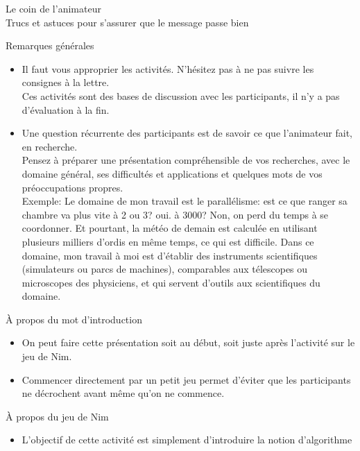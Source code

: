 \documentclass[final,hyperref={pdfpagelabels=false}]{beamer}
\renewcommand*{\footnotesize}{\fontsize{\resultfootnotesizeX}{\resultfootnotesizeY}\selectfont}
\renewcommand*{\large}{\fontsize{\resultlargeX}{\resultlargeY}\selectfont}
\begin{document}
\begin{frame}{Le coin de l'animateur\\[-5pt]
\label{coin::animateur}
  {\large Trucs et astuces pour s'assurer que le message passe bien}}
  \begin{block}{Remarques générales}
    \begin{itemize}
    \item Il faut vous approprier les activités. N'hésitez pas à ne pas suivre
      les consignes à la lettre.\\
      Ces activités sont des bases de discussion avec les participants, il n'y
      a pas d'évaluation à la fin.
    \item Une question récurrente des participants est de savoir ce que
      l'animateur fait, en recherche.\\
      Pensez à préparer une présentation compréhensible de vos recherches, avec
      le domaine général, ses difficultés et applications et quelques mots de
      vos préoccupations propres.\\
      {\footnotesize Exemple: Le domaine de mon travail est le parallélisme:
        est ce que ranger sa chambre va plus vite à 2 ou 3? oui. à 3000? Non,
        on perd du temps à se coordonner. Et pourtant, la météo de demain est
        calculée en utilisant plusieurs milliers d'ordis en même temps, ce qui
        est difficile. Dans ce domaine, mon travail à moi est d'établir des
        instruments scientifiques (simulateurs ou parcs de machines),
        comparables aux télescopes ou microscopes des physiciens, et qui
        servent d'outils aux scientifiques du domaine.}
    \end{itemize}
  \end{block}
  \begin{block}{À propos du mot d'introduction}
    \begin{itemize}
    \item On peut faire cette présentation soit au début, soit juste après
      l'activité sur le jeu de Nim.
    \item Commencer directement par un petit jeu permet d'éviter que les
      participants ne décrochent avant même qu'on ne commence.
    \end{itemize}
  \end{block}
  \begin{block}{À propos du jeu de Nim}
    \begin{itemize}
    \item L'objectif de cette activité est simplement d'introduire la notion d'algorithme

\end{itemize}
\end{block}
\end{frame}
\end{document}
